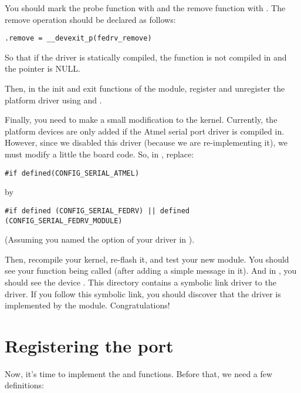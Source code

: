 You should mark the probe function with  and the remove
function with . The remove operation should be declared as
follows:

\begin{verbatim}
.remove = __devexit_p(fedrv_remove)
\end{verbatim}

So that if the driver is statically compiled, the
 function is not compiled in and the
 pointer is NULL.

Then, in the init and exit functions of the module, register and
unregister the platform driver using
 and
.

Finally, you need to make a small modification to the
kernel. Currently, the  platform devices are only added
if the Atmel serial port driver is compiled in. However, since we
disabled this driver (because we are re-implementing it), we must
modify a little the board code. So, in
, replace:

\begin{verbatim}
#if defined(CONFIG_SERIAL_ATMEL)
\end{verbatim}

by

\begin{verbatim}
#if defined (CONFIG_SERIAL_FEDRV) || defined (CONFIG_SERIAL_FEDRV_MODULE)
\end{verbatim}

(Assuming you named the option of your driver  in
).

Then, recompile your kernel, re-flash it, and test your new
module. You should see your  function being called
(after adding a simple  message in it). And in
, you should see the device
. This directory contains a symbolic link driver
to the  driver. If you follow this symbolic link,
you should discover that the  driver is implemented
by the  module. Congratulations!

\section{Registering the port}

Now, it's time to implement the  and 
functions. Before that, we need a few definitions:

